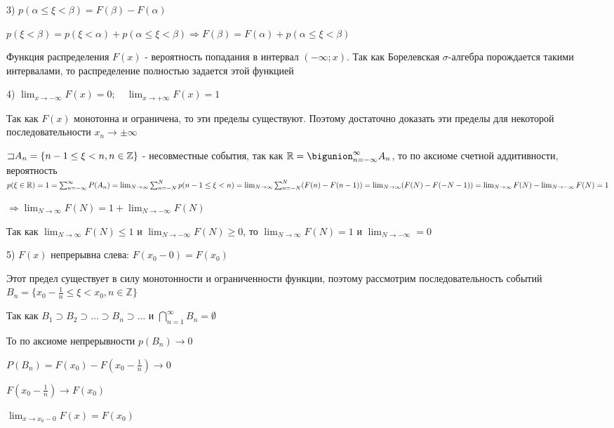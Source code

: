 \documentclass[12pt]{article}
\begin{document}
    3) $p(\alpha \leq \xi < \beta) = F(\beta) - F(\alpha)$

    \begin{MyProof}
        $p(\xi < \beta) = p(\xi < \alpha) + p(\alpha \leq \xi < \beta) \Longrightarrow F(\beta) = F(\alpha) + p(\alpha \leq \xi < \beta)$
    \end{MyProof}
    
    \Notas Функция распределения $F(x)$ - вероятность попадания в интервал $(-\infty; x)$. Так как Борелевская $\sigma$-алгебра порождается такими интервалами,
    то распределение полностью задается этой функцией

    4) $\lim_{x \to -\infty} F(x) = 0; \quad \lim_{x \to +\infty} F(x) = 1$

    \begin{MyProof}
        Так как $F(x)$ монотонна и ограничена, то эти пределы существуют. Поэтому достаточно доказать эти пределы для некоторой последовательности $x_n \to \pm \infty$

        $\mathord{\sqsupset} A_n = \{n - 1 \leq \xi < n, n \in \mathbb{Z}\}$ - несовместные события, так как $\Real = \bigunion_{n = -\infty}^\infty A_n$, то
        по аксиоме счетной аддитивности, вероятность $p(\xi \in \mathbb{R}) = 1 = \sum_{n = -\infty}^\infty P(A_n) = \lim_{N \to \infty} \sum_{n = -N}^N p(n - 1 \leq \xi < n) = 
        \lim_{N \to \infty} \sum_{n = -N}^N (F(n) - F(n - 1)) = \lim_{N \to \infty} (F(N) - F(-N - 1)) = \lim_{N \to \infty} F(N) - \lim_{N \to -\infty} F(N) = 1$

        $\Longrightarrow \lim_{N \to \infty} F(N) = 1 + \lim_{N \to -\infty} F(N) $

        Так как $\lim_{N \to \infty} F(N) \leq 1$ и $\lim_{N \to -\infty} F(N) \geq 0$, то $\lim_{N \to \infty} F(N) = 1$ и $\lim_{N \to -\infty} = 0$
    \end{MyProof}
    
    5) $F(x)$ непрерывна слева: $F(x_0 - 0) = F(x_0)$

    \begin{MyProof}
        Этот предел существует в силу монотонности и ограниченности функции, поэтому рассмотрим последовательность событий $B_n = \{x_0 - \frac{1}{n} \leq \xi < x_0, n \in \mathbb{Z}\}$

        Так как $B_1 \supset B_2 \supset \dots \supset B_n \supset \dots$ и $\bigcap_{n = 1}^\infty B_n = \emptyset$

        То по аксиоме непрерывности $p(B_n) \to 0$

        $P(B_n) = F(x_0) - F(x_0 - \frac{1}{n}) \rightarrow 0$

        $F(x_0 - \frac{1}{n}) \to F(x_0)$

        $\lim_{x \to x_0 - 0} F(x) = F(x_0)$
    \end{MyProof}
    
\end{document}
